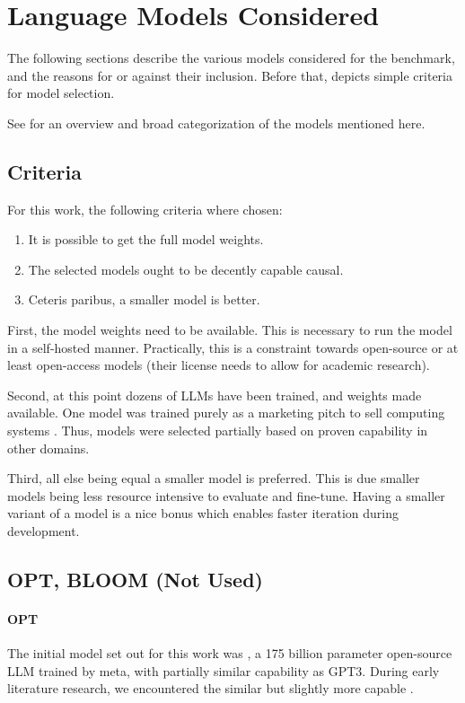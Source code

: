 \section{Language Models Considered}\label{sec:models}
The following sections describe the various models considered for the benchmark, and the reasons for or against their inclusion.
Before that,  depicts simple criteria for model selection.

See  for an overview and broad categorization of the models mentioned here.


\subsection{Criteria}\label{sub:criteria}
For this work, the following criteria where chosen:
\begin{enumerate}
    \item It is possible to get the full model weights.
    \item The selected models ought to be decently capable \gls{causal}.
    \item Ceteris paribus, a smaller model is better.
\end{enumerate}

First, the model weights need to be available. This is necessary to run the model in a self-hosted manner.
Practically, this is a constraint towards open-source or at least open-access models (their license needs to allow for academic research).

Second, at this point dozens of \glspl{LLM} have been trained, and weights made available.
One model was trained purely as a marketing pitch to sell computing systems \cite{dey_cerebrasgpt_2023}.
Thus, models were selected partially based on proven capability in other domains.

Third, all else being equal a smaller model is preferred.
This is due smaller models being less resource intensive to evaluate and fine-tune.
Having a smaller variant of a model is a nice bonus which enables faster iteration during development.


\subsection{OPT, BLOOM (Not Used)}
\paragraph{OPT}\label{par:opt}\label{sub:OPT}
The initial model set out for this work was  \cite{zhang_opt_2022}, a 175 billion parameter open-source \gls{LLM} trained by \gls{meta}, with partially similar capability as \gls{GPT3}. During early literature research, we encountered the similar but slightly more capable .

